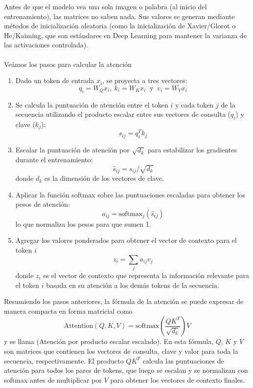 \noindent
Antes de que el modelo vea una sola imagen o palabra (al inicio del entrenamiento), las matrices no saben nada. Sus valores se generan mediante métodos de inicialización aleatoria (como la inicialización de Xavier/Glorot o He/Kaiming, que son estándares en Deep Learning para mantener la varianza de las activaciones controlada). \\ \\

\noindent
Veámos los pasos para calcular la atención
\begin{enumerate}
    \item Dado un token de entrada $x_i$, se proyecta a tres vectores: 
    $$q_i = W_Q x_i, \ k_i = W_K x_i \ \text{ y } \ v_i = W_V x_i$$
    \item Se calcula la puntuación de atención entre el token $i$ y cada token $j$ de la secuencia utilizando el producto escalar entre sus vectores de consulta ($q_i$) y clave ($k_j$): 
    $$s_{ij} = q_i^T k_j$$
    \item Escalar la puntuación de atención por $\sqrt{d_k}$ para estabilizar los gradientes durante el entrenamiento: 
    $$\hat{s}_{ij} = s_{ij} / \sqrt{d_k}$$
    donde $d_k$ es la dimensión de los vectores de clave.
    \item Aplicar la función softmax sobre las puntuaciones escaladas para obtener los pesos de atención: 
    $$a_{ij} = \text{softmax}_j(\hat{s}_{ij})$$ 
    lo que normaliza los pesos para que sumen 1.
    \item Agregar los valores ponderados para obtener el vector de contexto para el token $i$ 
    $$z_i = \sum_j a_{ij} v_j$$ 
    donde $z_i$ es el vector de contexto que representa la información relevante para el token $i$ basada en su atención a los demás tokens de la secuencia.
\end{enumerate}
Resumiendo los pasos anteriores, la fórmula de la atención se puede expresar de manera compacta en forma matricial como
\begin{equation*}
    \text{Attention}(Q, K, V) = \text{softmax}\left(\frac{QK^T}{\sqrt{d_k}}\right) V
\end{equation*} 
y se llama  (Atención por producto escalar escalado). En esta fórmula, $Q$, $K$ y $V$ son matrices que contienen los vectores de consulta, clave y valor para toda la secuencia, respectivamente. El producto $QK^T$ calcula las puntuaciones de atención para todos los pares de tokens, que luego se escalan y se normalizan con softmax antes de multiplicar por $V$ para obtener los vectores de contexto finales.

